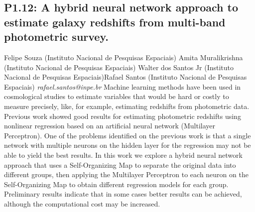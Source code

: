 \documentclass{report}
\begin{document}
\subsection*{P1.12: A hybrid neural network approach to estimate galaxy redshifts from multi-band photometric survey.}
\bigskip
Felipe Souza (Instituto Nacional de Pesquisas Espaciais) \newline Amita Muralikrishna (Instituto Nacional de Pesquisas Espaciais) \newline  Walter dos Santos Jr (Instituto Nacional de Pesquisas Espaciais)\newline  Rafael Santos (Instituto Nacional de Pesquisas Espaciais)\newline  \newline  \newline\newline
{\it rafael.santos@inpe.br}\newline
\newline\newline
Machine learning methods have been used in cosmological studies to estimate variables that would be hard or costly to measure precisely, like, for example, estimating redshifts from photometric data. Previous work showed good results for estimating photometric redshifts using nonlinear regression based on an artificial neural network (Multilayer Perceptron). 
One of the problems identified on the previous work is that a single network with multiple neurons on the hidden layer for the regression may not be able to yield the best results. 
In this work we explore a hybrid neural network approach that uses a Self-Organizing Map to separate the original data into different groups, then applying the Multilayer Perceptron to each neuron on the Self-Organizing Map to obtain different regression models for each group. Preliminary results indicate that in some cases better results can be achieved, although the computational cost may be increased.\newline
\newpage
\end{document}
